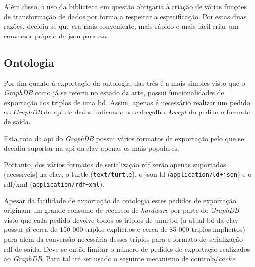 Além disso, o uso da biblioteca em questão obrigaria à criação de várias funções de transformação de dados por 
forma a respeitar a especificação. Por estas duas razões, decidiu-se que era mais conveniente, mais rápido e 
mais fácil criar um conversor próprio de \acrshort{json} para \acrshort{csv}.

\subsection{Ontologia}

Por fim quanto à exportação da ontologia, das três é a mais simples visto que o \textit{GraphDB} como já se referiu 
no estado da arte, possui funcionalidades de exportação dos triplos de uma \acrshort{bd}. 
Assim, apenas é necessário realizar um pedido ao \textit{GraphDB} da \acrshort{api} de dados indicando no cabeçalho \textit{Accept} 
do pedido o formato de saída.

Esta rota da \acrshort{api} do \textit{GraphDB} possui vários formatos de exportação pelo que se decidiu suportar na \acrshort{api} 
da \acrshort{clav} apenas os mais populares.

Portanto, dos vários formatos de serialização \acrshort{rdf} serão apenas suportados (acessíveis) na 
\acrshort{clav}, o \acrshort{turtle} (\texttt{text/turtle}), o \acrshort{json-ld} (\texttt{application/ld+json}) e 
o \acrshort{rdf}/\acrshort{xml} (\texttt{application/rdf+xml}).

Apesar da facilidade de exportação da ontologia estes pedidos de exportação originam um grande consumo de 
recursos de \textit{hardware} por parte do \textit{GraphDB} visto que cada pedido devolve todos os triplos 
de uma \acrshort{bd} (a atual \acrshort{bd} da \acrshort{clav} possui já cerca de 150 000 triplos explícitos e 
cerca de 85 000 triplos implícitos) para além da conversão necessária desses triplos para o formato de 
serialização \acrshort{rdf} de saída. Deve-se então limitar o número de pedidos de exportação realizados ao 
\textit{GraphDB}. Para tal irá ser usado o seguinte mecanismo de controlo/\textit{cache}:\label{sec:expOntCache}

